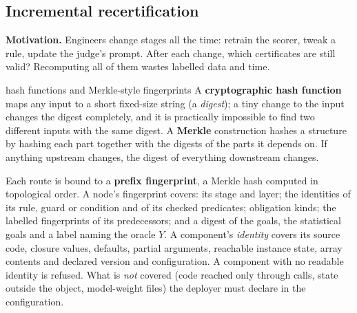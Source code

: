 \subsection{Incremental recertification}

\textbf{Motivation.} Engineers change stages all the time: retrain the scorer, tweak a rule, update the judge's prompt. After each change, which certificates are still valid? Recomputing all of them wastes labelled data and time.

\begin{toolbox}{hash functions and Merkle-style fingerprints}
A \textbf{cryptographic hash function} maps any input to a short fixed-size string (a \emph{digest}); a tiny change to the input changes the digest completely, and it is practically impossible to find two different inputs with the same digest. A \textbf{Merkle} construction hashes a structure by hashing each part together with the digests of the parts it depends on. If anything upstream changes, the digest of everything downstream changes.
\end{toolbox}

Each route is bound to a \textbf{prefix fingerprint}, a Merkle hash computed in topological order. A node's fingerprint covers: its stage and layer; the identities of its rule, guard or condition and of its checked predicates; obligation kinds; the labelled fingerprints of its predecessors; and a digest of the goals, the statistical goals and a label naming the oracle $Y$. A component's \emph{identity} covers its source code, closure values, defaults, partial arguments, reachable instance state, array contents and declared version and configuration. A component with no readable identity is refused. What is \emph{not} covered (code reached only through calls, state outside the object, model-weight files) the deployer must declare in the configuration.

\begin{center}
\end{center}


